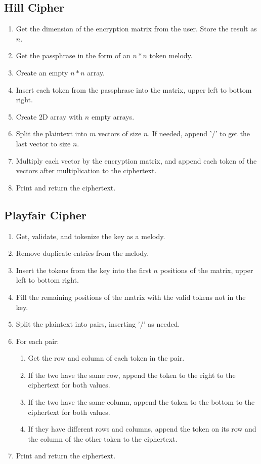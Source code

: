 \documentclass[14pt]{article}
\begin{document}
    	\subsection{Hill Cipher}
        \begin{enumerate}
            \item Get the dimension of the encryption matrix from the user. Store the result as $n$.
            \item Get the passphrase in the form of an $n * n$ token melody.
            \item Create an empty $n * n$ array.
            \item Insert each token from the passphrase into the matrix, upper left to bottom right.
            \item Create 2D array with $n$ empty arrays.
            \item Split the plaintext into $m$ vectors of size $n$. If needed, append '/' to get the last vector to size $n$.
            \item Multiply each vector by the encryption matrix, and append each token of the vectors after multiplication to the ciphertext.
            \item Print and return the ciphertext.
        \end{enumerate}
        
    	\subsection{Playfair Cipher}
        \begin{enumerate}
            \item Get, validate, and tokenize the key as a melody.
            \item Remove duplicate entries from the melody.
            \item Insert the tokens from the key into the first $n$ positions of the matrix, upper left to bottom right.
            \item Fill the remaining positions of the matrix with the valid tokens not in the key.
            \item Split the plaintext into pairs, inserting '/' as needed.
            \item For each pair:
                \begin{enumerate}
                    \item Get the row and column of each token in the pair.
                    \item If the two have the same row, append the token to the right to the ciphertext for both values.
                    \item If the two have the same column, append the token to the bottom to the ciphertext for both values.
                    \item If they have different rows and columns, append the token on its row and the column of the other token to the ciphertext.
                \end{enumerate}
            \item Print and return the ciphertext.
        \end{enumerate}
        
\end{document}
